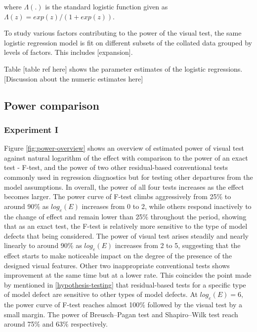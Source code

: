 \documentclass[]{interact}
\theoremstyle{plain}%
\theoremstyle{definition}
\theoremstyle{remark}
\begin{document}
where \(\Lambda(.)\) is the standard logistic function given as
\(\Lambda(z) = exp(z)/(1+exp(z))\).

To study various factors contributing to the power of the visual test,
the same logistic regression model is fit on different subsets of the
collated data grouped by levels of factors. This includes
{[}expansion{]}.

Table {[}table ref here{]} shows the parameter estimates of the logistic
regressions. {[}Discussion about the numeric estimates here{]}

\hypertarget{power-comparison}{%
\subsection{Power comparison}\label{power-comparison}}

\hypertarget{experiment-i}{%
\subsubsection{Experiment I}\label{experiment-i}}

Figure \ref{fig:power-overview} shows an overview of estimated power of
visual test against natural logarithm of the effect with comparison to
the power of an exact test - F-test, and the power of two other
residual-based conventional tests commonly used in regression
diagnostics but for testing other departures from the model assumptions.
In overall, the power of all four tests increases as the effect becomes
larger. The power curve of F-test climbs aggressively from 25\% to
around 90\% as \(log_e(E)\) increases from 0 to 2, while others respond
inactively to the change of effect and remain lower than 25\% throughout
the period, showing that as an exact test, the F-test is relatively more
sensitive to the type of model defects that being considered. The power
of visual test arises steadily and nearly linearly to around 90\% as
\(log_e(E)\) increases from 2 to 5, suggesting that the effect starts to
make noticeable impact on the degree of the presence of the designed
visual features. Other two inappropriate conventional tests shows
improvement at the same time but at a lower rate. This coincides the
point made by \citet{cook1982residuals} mentioned in
\ref{hypothesis-testing} that residual-based tests for a specific type
of model defect are sensitive to other types of model defects. At
\(log_e(E) = 6\), the power curve of F-test reaches almost 100\%
followed by the visual test by a small margin. The power of
Breusch--Pagan test and Shapiro--Wilk test reach around 75\% and 63\%
respectively.
\end{document}

